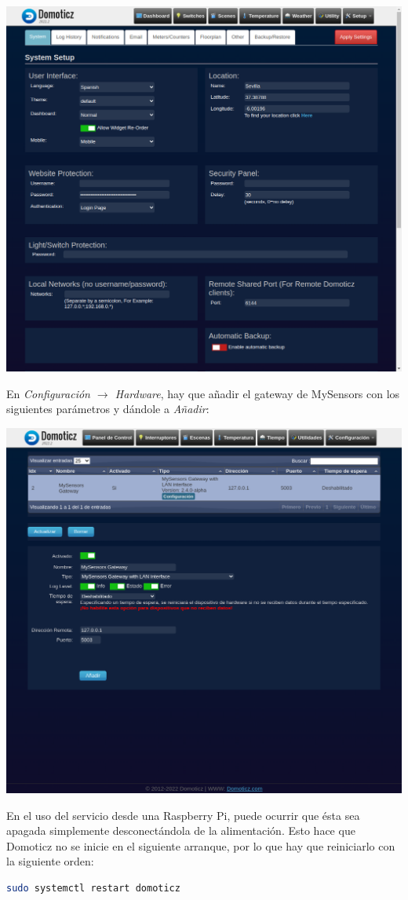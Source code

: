 \includegraphics[width=\linewidth]{rpi-setup/domoticz-initial-setup.png}

En \emph{Configuración $\rightarrow$ Hardware}, hay que añadir el gateway de
MySensors con los siguientes parámetros y dándole a \emph{Añadir}:

\includegraphics[width=\linewidth]{rpi-setup/domoticz-hardware-setup.png}

En el uso del servicio desde una Raspberry Pi, puede ocurrir que ésta sea
apagada simplemente desconectándola de la alimentación. Esto hace que Domoticz
no se inicie en el siguiente arranque, por lo que hay que reiniciarlo con la
siguiente orden:

\begin{lstlisting}[language=sh]
sudo systemctl restart domoticz
\end{lstlisting}